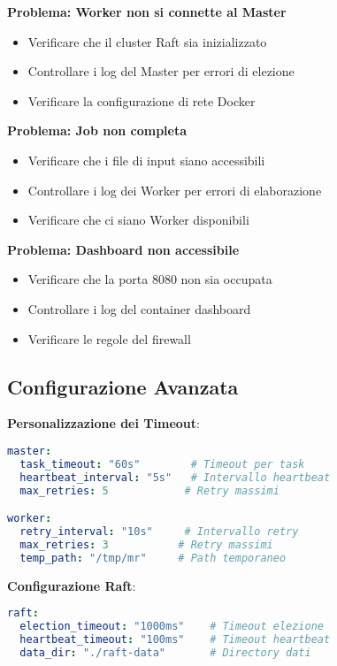 \documentclass[12pt,a4paper]{article}
\begin{document}
\textbf{Problema: Worker non si connette al Master}
\begin{itemize}
\item Verificare che il cluster Raft sia inizializzato
\item Controllare i log del Master per errori di elezione
\item Verificare la configurazione di rete Docker
\end{itemize}

\textbf{Problema: Job non completa}
\begin{itemize}
\item Verificare che i file di input siano accessibili
\item Controllare i log dei Worker per errori di elaborazione
\item Verificare che ci siano Worker disponibili
\end{itemize}

\textbf{Problema: Dashboard non accessibile}
\begin{itemize}
\item Verificare che la porta 8080 non sia occupata
\item Controllare i log del container dashboard
\item Verificare le regole del firewall
\end{itemize}

\subsection{Configurazione Avanzata}

\textbf{Personalizzazione dei Timeout}:
\begin{lstlisting}[language=yaml, caption=config.yaml]
master:
  task_timeout: "60s"        # Timeout per task
  heartbeat_interval: "5s"   # Intervallo heartbeat
  max_retries: 5            # Retry massimi

worker:
  retry_interval: "10s"     # Intervallo retry
  max_retries: 3           # Retry massimi
  temp_path: "/tmp/mr"     # Path temporaneo
\end{lstlisting}

\textbf{Configurazione Raft}:
\begin{lstlisting}[language=yaml, caption=Configurazione Raft]
raft:
  election_timeout: "1000ms"    # Timeout elezione
  heartbeat_timeout: "100ms"    # Timeout heartbeat
  data_dir: "./raft-data"       # Directory dati
\end{lstlisting}
\end{document}
